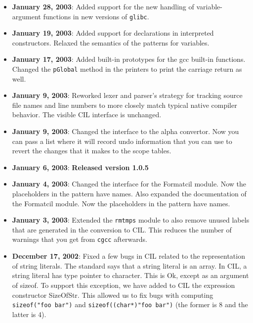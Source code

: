 \documentclass{article}
\def\t#1{{\tt #1}}
\begin{document}
\begin{itemize}
\item {\bf January 28, 2003}: Added support for the new handling of
variable-argument functions in new versions of \t{glibc}. 
\item {\bf January 19, 2003}: Added support for declarations in interpreted
  constructors. Relaxed the semantics of the patterns for variables. 
\item {\bf January 17, 2003}: Added built-in prototypes for the gcc built-in
  functions. Changed the \t{pGlobal} method in the printers to print the
  carriage return as well.
\item {\bf January 9, 2003}: Reworked lexer and parser's strategy for
  tracking source file names and line numbers to more closely match
  typical native compiler behavior.  The visible CIL interface is
  unchanged.
\item {\bf January 9, 2003}: Changed the interface to the alpha convertor. Now
you can pass a list where it will record undo information that you can use to
revert the changes that it makes to the scope tables.
\item {\bf January 6, 2003}: {\bf Released version 1.0.5}
\item {\bf January 4, 2003}: Changed the interface for the Formatcil module.
  Now the placeholders in the pattern have names. Also expanded the
  documentation of the Formatcil module.
  Now the placeholders in the pattern have names.
\item {\bf January 3, 2003}: Extended the \t{rmtmps} module to also remove
  unused labels that are generated in the conversion to CIL. This reduces the
  number of warnings that you get from \t{cgcc} afterwards.
\item {\bf December 17, 2002}: Fixed a few bugs in CIL related to the
  representation of string literals. The standard says that a string literal
  is an array. In CIL, a string literal has type pointer to character. This is
  Ok, except as an argument of sizeof. To support this exception, we have
  added to CIL the expression constructor SizeOfStr. This allowed us to fix
  bugs with computing \t{sizeof("foo bar")} and \t{sizeof((char*)"foo bar")}
  (the former is 8 and the latter is 4).


\end{itemize}
\end{document}
